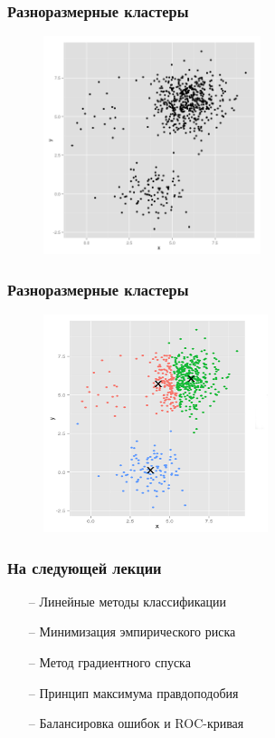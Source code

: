 \documentclass[12pt]{beamer}
\begin{document}
\begin{frame}\frametitle{Разноразмерные кластеры}
\begin{figure}[htbp]
  \includegraphics[height=180pt, keepaspectratio = true]{images/different_sizes-1}  
\end{figure}
\end{frame}

\begin{frame}\frametitle{Разноразмерные кластеры}
\begin{figure}[htbp]
  \includegraphics[height=180pt, keepaspectratio = true]{images/different_sizes-2}  
\end{figure}
\end{frame}

\begin{frame}\frametitle{На следующей лекции}
\begin{itemize}
\item[--] Линейные методы классификации
\item[--] Минимизация эмпирического риска
\item[--] Метод градиентного спуска
\item[--] Принцип максимума правдоподобия
\item[--] Балансировка ошибок и ROC-кривая
\end{itemize}
\end{frame}
\end{document}
